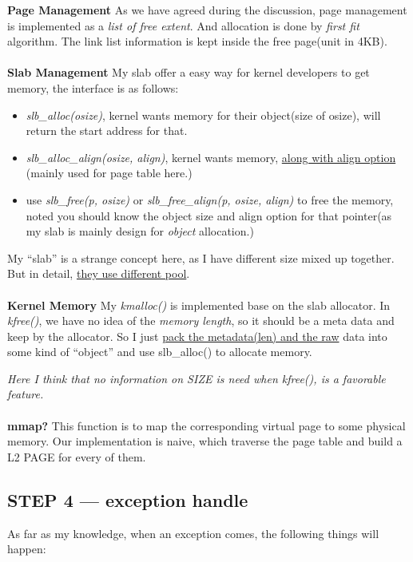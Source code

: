 \documentclass[12pt]{article}
\begin{document}
\textbf{Page Management}
As we have agreed during the discussion, page management is implemented as a \emph{list of free extent}. And allocation is done by \emph{first fit} algorithm. The link list information is kept inside the free page(unit in 4KB).
\\~\\

\textbf{Slab Management}
My slab offer a easy way for kernel developers to get memory, the interface is as follows:
\begin{itemize}
	\item	\emph{slb\_alloc(osize)}, kernel wants memory for their object(size of osize), will return the start address for that.
	\item \emph{slb\_alloc\_align(osize, align)}, kernel wants memory, \underline{along with align option} (mainly used for page table here.)
	\item	use \emph{slb\_free(p, osize)} or \emph{slb\_free\_align(p, osize, align)} to free the memory, noted you should know the object size and align option for that pointer(as my slab is mainly design for \emph{object} allocation.)
\end{itemize}

My ``slab'' is a strange concept here, as I have different size mixed up together. But in detail, \underline{they use different pool}.
\\~\\

\textbf{Kernel Memory}
My \emph{kmalloc()} is implemented base on the slab allocator. In \emph{kfree()}, we have no idea of the \emph{memory length}, so it should be a meta data and keep by the allocator. So I just \underline{pack the metadata(len) and the raw} data into some kind of ``object'' and use slb\_alloc() to allocate memory. 

\emph{Here I think that no information on SIZE is need when kfree(), is a favorable feature.}
\\~\\

\textbf{mmap?} This function is to map the corresponding virtual page to some physical memory. Our implementation is naive, which traverse the page table and build a L2 PAGE for every of them.

\subsection{STEP 4 --- exception handle}
As far as my knowledge, when an exception comes, the following things will happen:
\end{document}
